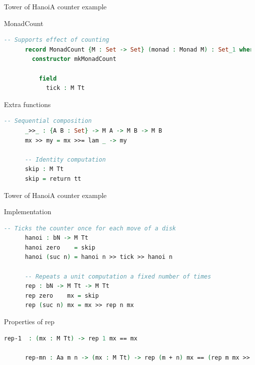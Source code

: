 \documentclass{beamer}
\begin{document}
\begin{frame}[fragile]{Tower of Hanoi}{A counter example}
  \begin{block}{MonadCount}
    \begin{lstlisting}[language=Agda, mathescape]
      -- Supports effect of counting
      record MonadCount {M : Set -> Set} (monad : Monad M) : Set_1 where
        constructor mkMonadCount

          field
            tick : M Tt
    \end{lstlisting}
  \end{block}

  \begin{block}{Extra functions}
    \begin{lstlisting}[language=Agda, mathescape]
      -- Sequential composition
      _>>_ : {A B : Set} -> M A -> M B -> M B
      mx >> my = mx >>= lam _ -> my

      -- Identity computation
      skip : M Tt
      skip = return tt
    \end{lstlisting}
  \end{block}
\end{frame}

\begin{frame}[fragile]{Tower of Hanoi}{A counter example}
  \begin{block}{Implementation}
    \begin{lstlisting}[language=Agda, mathescape]
      -- Ticks the counter once for each move of a disk
      hanoi : bN -> M Tt
      hanoi zero    = skip
      hanoi (suc n) = hanoi n >> tick >> hanoi n

      -- Repeats a unit computation a fixed number of times
      rep : bN -> M Tt -> M Tt
      rep zero    mx = skip
      rep (suc n) mx = mx >> rep n mx
    \end{lstlisting}
  \end{block}

  \begin{block}{Properties of rep}
    \begin{lstlisting}[language=Agda, mathescape]
      rep-1  : (mx : M Tt) -> rep 1 mx == mx

      rep-mn : Aa m n -> (mx : M Tt) -> rep (m + n) mx == (rep m mx >> rep n mx)
    \end{lstlisting}
  \end{block}
\end{frame}
\end{document}
